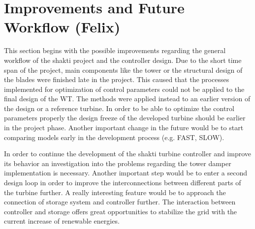 \section{Improvements and Future Workflow (Felix)}
This section begins with the possible improvements regarding the general workflow of the \gls{shakti} project and the controller design.
Due to the short time span of the project, main components like the tower or the structural design of the blades were finished late in the project.
This caused that the processes implemented for optimization of control parameters could not be applied to the final design of the \gls{WT}.
The methods were applied instead to an earlier version of the design or a reference turbine.
In order to be able to optimize the control parameters properly the design freeze of the developed turbine should be earlier in the project phase.
Another important change in the future would be to start comparing models early in the development process (e.g. FAST, SLOW).

In order to continue the development of the \gls{shakti} turbine controller and improve its behavior an investigation into the problems regarding the tower damper implementation is necessary.
Another important step would be to enter a second design loop in order to improve the interconnections between different parts of the turbine further.
A really interesting feature would be to approach the connection of storage system and controller further.
The interaction between controller and storage offers great opportunities to stabilize the grid with the current increase of renewable energies.
